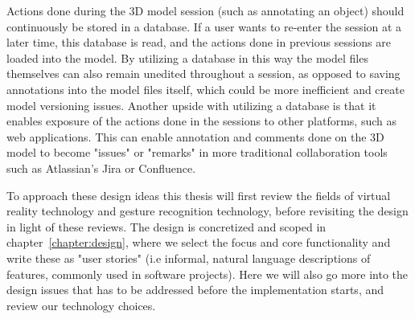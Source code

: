 Actions done during the 3D model session (such as annotating an object) should continuously be stored in a database. 
If a user wants to re-enter the session at a later time, this database is read, and the actions done in previous sessions are loaded into the model.
By utilizing a database 
in this way the model files themselves can also remain unedited throughout a session, as opposed to saving annotations into the model files itself, 
which could be more inefficient and create model versioning issues. 
Another upside with utilizing a database is that it enables exposure of the actions done in the sessions to other platforms, such as web applications. 
This can enable annotation and comments done on the 3D model to become "issues" or "remarks" in more traditional collaboration tools such as Atlassian's Jira or Confluence.

To approach these design ideas this thesis will first review the fields of virtual reality technology and gesture recognition technology, before revisiting the design in light
of these reviews. The design is concretized and scoped in chapter~\vref{chapter:design}, where we select the focus and core functionality and write these as 
"user stories" (i.e informal, natural language descriptions of features, commonly used in software projects). Here we will also go more into the design issues that has to be
addressed before the implementation starts, and review our technology choices.  






